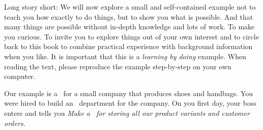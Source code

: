 Long story short:
We will now explore a small and self-contained example not to teach you how exactly to do things, but to show you what is possible.
And that many things are possible without in-depth knowledge and lots of work.
To make you curious.
To invite you to explore things out of your own interest and to circle back to this book to combine practical experience with background information when you like.
It is important that this is a \emph{learning by doing} example.
When reading the text, please reproduce the example step-by-step on your own computer.

Our example is a \dbs\ for a small company that produces shoes and handbags.
You were hired to build an ~department for the company.
On you first day, your boss enters and tells you \emph{Make a \db\ for storing all our product variants and customer orders.}
